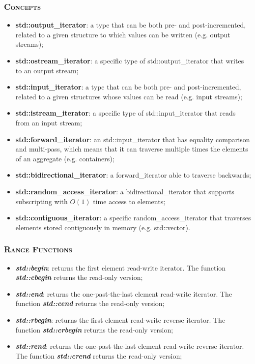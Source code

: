 \documentclass[10pt]{article}
\begin{document}
\begin{multicols*}{5}
{\subsubsection*{\textsc{Concepts}} 
\begin{itemize}[leftmargin=*,topsep=0.25pt]
  \setlength\itemsep{.3pt}
	\item \textbf{std::output\_iterator}: a type that can be both pre- and post-incremented, related to a given structure to which values can be written (e.g. output streams);
	\item \textbf{std::ostream\_iterator}: a specific type of std::out\-put\_i\-te\-ra\-tor that writes to an output stream;
	\item \textbf{std::input\_iterator}: a type that can be both pre- and post-incremented, related to a given structures whose values can be read (e.g. input streams);
	\item \textbf{std::istream\_iterator}: a specific type of std::in\-put\_i\-te\-ra\-tor that reads from an input stream;
	\item \textbf{std::forward\_iterator}: an std::input\_iterator that has equality comparison and multi-pass, which means that it can traverse multiple times the elements of an aggregate (e.g. containers); 
	\item \textbf{std::bidirectional\_iterator}: a forward\_iterator able to traverse backwards; 
	\item \textbf{std::random\_access\_iterator}: a bidirectional\_iterator that supports subscripting with $O(1)$ time access to elements; 
	\item \textbf{std::contiguous\_iterator}: a specific ran\-dom\_ac\-cess\_i\-te\-ra\-tor that traverses elements stored contiguously in memory (e.g. std::vector). 
\end{itemize}

\subsubsection*{\textsc{Range Functions}} 
\begin{itemize}[leftmargin=*,topsep=0.25pt]
  \setlength\itemsep{.3pt}
	\item  \emph{\textbf{std::begin}}: returns the first element read-write iterator. The function \emph{\textbf{std::cbegin}} returns the read-only version;
	\item  \emph{\textbf{std::end}}: returns the one-past-the-last element read-write iterator. The function \emph{\textbf{std::cend}} returns the read-only version;
	\item  \emph{\textbf{std::rbegin}}: returns the first element read-write reverse iterator. The function \emph{\textbf{std::crbegin}} returns the read-only version;
	\item  \emph{\textbf{std::rend}}: returns the one-past-the-last element read-write reverse iterator. The function \emph{\textbf{std::crend}} returns the read-only version;
\end{itemize}

}
\end{multicols*}
\end{document}
